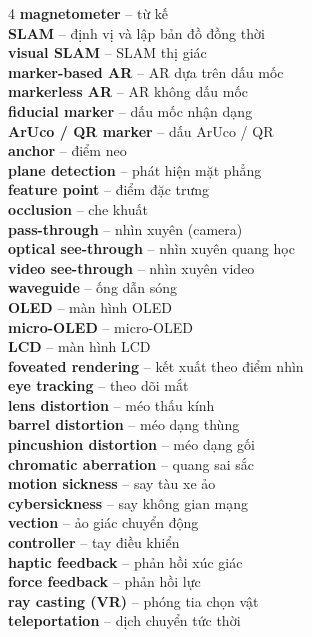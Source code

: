 \begin{multicols}{4}
\textbf{magnetometer} -- từ kế\\
\textbf{SLAM} -- định vị và lập bản đồ đồng thời\\
\textbf{visual SLAM} -- SLAM thị giác\\
\textbf{marker-based AR} -- AR dựa trên dấu mốc\\
\textbf{markerless AR} -- AR không dấu mốc\\
\textbf{fiducial marker} -- dấu mốc nhận dạng\\
\textbf{ArUco / QR marker} -- dấu ArUco / QR\\
\textbf{anchor} -- điểm neo\\
\textbf{plane detection} -- phát hiện mặt phẳng\\
\textbf{feature point} -- điểm đặc trưng\\
\textbf{occlusion} -- che khuất\\
\textbf{pass-through} -- nhìn xuyên (camera)\\
\textbf{optical see-through} -- nhìn xuyên quang học\\
\textbf{video see-through} -- nhìn xuyên video\\
\textbf{waveguide} -- ống dẫn sóng\\
\textbf{OLED} -- màn hình OLED\\
\textbf{micro-OLED} -- micro-OLED\\
\textbf{LCD} -- màn hình LCD\\
\textbf{foveated rendering} -- kết xuất theo điểm nhìn\\
\textbf{eye tracking} -- theo dõi mắt\\
\textbf{lens distortion} -- méo thấu kính\\
\textbf{barrel distortion} -- méo dạng thùng\\
\textbf{pincushion distortion} -- méo dạng gối\\
\textbf{chromatic aberration} -- quang sai sắc\\
\textbf{motion sickness} -- say tàu xe ảo\\
\textbf{cybersickness} -- say không gian mạng\\
\textbf{vection} -- ảo giác chuyển động\\
\textbf{controller} -- tay điều khiển\\
\textbf{haptic feedback} -- phản hồi xúc giác\\
\textbf{force feedback} -- phản hồi lực\\
\textbf{ray casting (VR)} -- phóng tia chọn vật\\
\textbf{teleportation} -- dịch chuyển tức thời\\

\end{multicols}
